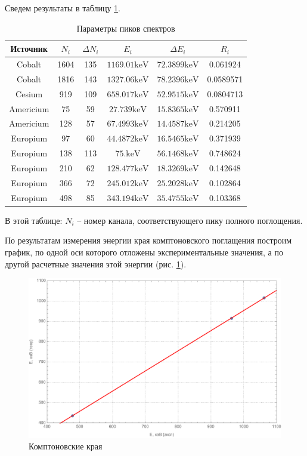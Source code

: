 \documentclass[a4paper, 12pt]{article}
\begin{document}
\newpage
\newpage
Сведем результаты в таблицу \ref{table1}.
\begin{table}[!htb]
\centering
\caption{Параметры пиков спектров}
\begin{tabular}{|c|c|c|c|c|c|}
\hline
Источник & $N_i$ & $\Delta N_i$ & $E_i$ & $\Delta E_i$ & $R_i$ \\
\hline
Cobalt & 1604 & 135 & $1169.01\text{keV}$ & $72.3899\text{keV}$ & 0.061924 \\
Cobalt & 1816 & 143 & $1327.06\text{keV}$ & $78.2396\text{keV}$ & 0.0589571 \\
Cesium & 919 & 109 & $658.017\text{keV}$ & $52.9515\text{keV}$ & 0.0804713 \\
Americium & 75 & 59 & $27.739\text{keV}$ & 1$5.8365\text{keV}$ & 0.570911 \\
Americium & 128 & 57 & $67.4993\text{keV}$ & $14.4587\text{keV}$ & 0.214205 \\
Europium & 97 & 60 & $44.4872\text{keV}$ & $16.5465\text{keV}$ & 0.371939 \\
Europium & 138 & 113 & $75.\text{keV}$ & $56.1468\text{keV}$ & 0.748624 \\
Europium & 210 & 62 & $128.477\text{keV}$ & $18.3269\text{keV}$ & 0.142648 \\
Europium & 366 & 72 & $245.012\text{keV}$ & $25.2028\text{keV}$ & 0.102864 \\
Europium & 498 & 85 & $343.194\text{keV}$ & $35.4755\text{keV}$ & 0.103368 \\
\hline
\end{tabular}
\label{table1}
\end{table}
В этой таблице: $N_i$ -- номер канала, соответствующего пику полного поглощения.\par
По результатам измерения энергии края комптоновского поглащения построим график, по одной оси которого отложены экспериментальные значения, а по другой расчетные значения этой энергии (рис. \ref{compton}).\par
\begin{figure}
\centering
\includegraphics[scale=0.5]{edges.pdf}
\caption{Комптоновские края}
\label{compton}
\end{figure}
\end{document}
